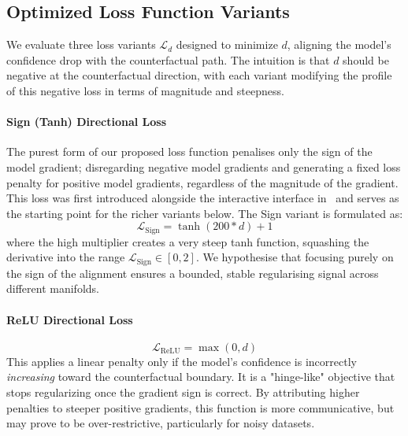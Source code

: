 \subsection{Optimized Loss Function Variants}
We evaluate three loss variants $\mathcal{L}_{d}$ designed to minimize $d$, aligning the model's confidence drop with the counterfactual path. The intuition is that $d$ should be negative at the counterfactual direction, with each variant modifying the profile of this negative loss in terms of magnitude and steepness.

\paragraph{Sign (Tanh) Directional Loss}
The purest form of our proposed loss function penalises only the sign of the model gradient; disregarding negative model gradients and generating a fixed loss penalty for positive model gradients, regardless of the magnitude of the gradient. This loss was first introduced alongside the interactive interface in~\cite{erskine2024ijcai} and serves as the starting point for the richer variants below.
The Sign variant is formulated as:
\begin{equation}
    \mathcal{L}_{\text{Sign}} = \tanh(200*d) + 1
\end{equation}
where the high multiplier creates a very steep tanh function, squashing the derivative into the range $\mathcal{L}_{\text{Sign}} \in [0,2]$. We hypothesise that focusing purely on the sign of the alignment ensures a bounded, stable regularising signal across different manifolds.


\paragraph{ReLU Directional Loss}
\begin{equation}
    \mathcal{L}_{\text{ReLU}} = \max(0, d)
\end{equation}
This applies a linear penalty only if the model's confidence is incorrectly \emph{increasing} toward the counterfactual boundary. It is a "hinge-like" objective that stops regularizing once the gradient sign is correct. By attributing higher penalties to steeper positive gradients, this function is more communicative, but may prove to be over-restrictive, particularly for noisy datasets.

